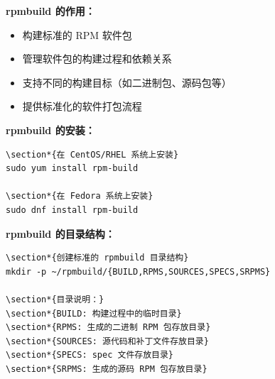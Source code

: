 \documentclass[12pt,UTF8]{ctexbook}
\begin{document}
\textbf{rpmbuild 的作用：}
\begin{itemize}
    \item 构建标准的 RPM 软件包
    \item 管理软件包的构建过程和依赖关系
    \item 支持不同的构建目标（如二进制包、源码包等）
    \item 提供标准化的软件打包流程
\end{itemize}

\textbf{rpmbuild 的安装：}
\begin{verbatim}
\section*{在 CentOS/RHEL 系统上安装}
sudo yum install rpm-build

\section*{在 Fedora 系统上安装}
sudo dnf install rpm-build
\end{verbatim}

\textbf{rpmbuild 的目录结构：}
\begin{verbatim}
\section*{创建标准的 rpmbuild 目录结构}
mkdir -p ~/rpmbuild/{BUILD,RPMS,SOURCES,SPECS,SRPMS}

\section*{目录说明：}
\section*{BUILD: 构建过程中的临时目录}
\section*{RPMS: 生成的二进制 RPM 包存放目录}
\section*{SOURCES: 源代码和补丁文件存放目录}
\section*{SPECS: spec 文件存放目录}
\section*{SRPMS: 生成的源码 RPM 包存放目录}
\end{verbatim}
\end{document}
